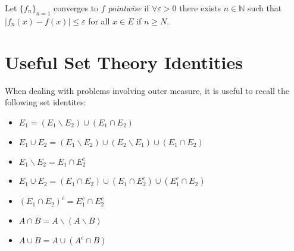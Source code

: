 \begin{definition}
 Let $\{f_n\}_{n=1}$ converges to $f$ \textit{pointwise} if $\forall\varepsilon>0$ there exists $n\in\mathbb{N}$ such that $|f_{n}(x) - f(x)|\leq\varepsilon$ for all $x\in E$ if $n\geq N$. 
\end{definition}


\newpage
\section{Useful Set Theory Identities}
When dealing with problems involving outer measure, it is useful to recall the following set identites: \begin{itemize}
    \item $E_1 = (E_1 \backslash E_2) \cup (E_1 \cap E_2)$
    \item $E_1 \cup E_2 = (E_1 \backslash E_2) \cup (E_2 \backslash E_1) \cup (E_1 \cap E_2) $
    \item $E_1 \backslash E_2 = E_1 \cap E_2^c$
    \item $E_1 \cup E_2 = (E_1\cap E_2)\cup(E_1 \cap E_2^c) \cup (E_1^c \cap E_2)$ 
    \item $(E_1 \cap E_2)^c = E_1^c \cap E_2^c$
    \item $A\cap B = A\backslash (A\backslash B)$
    \item $A\cup B = A\cup (A^c\cap B)$
\end{itemize}
